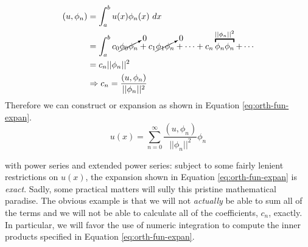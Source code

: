 \begin{align*}
\left(u,\phi_n\right) &= \int_{a}^{b}u(x)\phi_n(x) \ dx \\
&= \int_{a}^{b} c_0 \cancelto{0}{\phi_0 \phi_n} + c_1\cancelto{0}{\phi_1 \phi_n} + \cdots + c_n\overbracket{\phi_n \phi_n}^{||\phi_n||^2} + \cdots \\
&= c_n||\phi_n||^2  \\
&\Rightarrow c_n = \frac{(u,\phi_n)}{||\phi_n||^2}
\end{align*}
Therefore we can construct or expansion as shown in Equation \ref{eq:orth-fun-expan}.
\begin{equation}
u(x) = \sum\limits_{n=0}^{\infty}\frac{\left(u,\phi_n\right)}{||\phi_n||^2}\phi_n
\label{eq:orth-fun-expan}
\end{equation}

 with power series and extended power series: subject to some fairly lenient restrictions on $u(x)$, the expansion shown in Equation \ref{eq:orth-fun-expan} is \emph{exact}.  Sadly, some practical matters will sully this pristine mathematical paradise.  The obvious example is that we will not \emph{actually} be able to sum all of the terms and we will not be able to calculate all of the coefficients, $c_n$, exactly.  In particular, we will favor the use of numeric integration to compute the inner products specified in Equation \ref{eq:orth-fun-expan}.   
